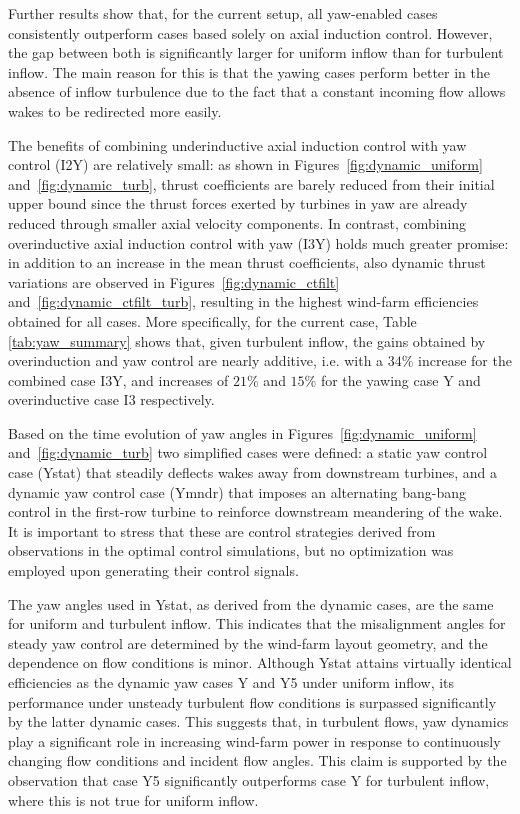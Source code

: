 \documentclass[energies,article,submit,moreauthors,latex,10pt,a4paper]{mdpi}
\newcommand{\revision}[1]{{\color{red} #1}}
\begin{document}
Further results show that, for the current setup, all yaw-enabled cases consistently outperform cases based solely on axial induction control. However, the gap between both is significantly larger for uniform inflow than for turbulent inflow. The main reason for this is that the yawing cases perform better in the absence of inflow turbulence due to the fact that a \revision{constant incoming} flow allows wakes to be redirected more easily. 

The benefits of combining underinductive axial induction control with yaw control (I2Y) are relatively small: as shown in Figures~\ref{fig:dynamic_uniform} and~\ref{fig:dynamic_turb}, thrust coefficients are barely reduced from their initial upper bound since the thrust forces exerted by turbines in yaw are already reduced through smaller axial velocity components. In contrast, combining overinductive axial induction control with yaw (I3Y) holds much greater promise: in addition to an increase in the mean thrust coefficients, also dynamic thrust variations are observed in Figures~\ref{fig:dynamic_ctfilt} and~\ref{fig:dynamic_ctfilt_turb}, resulting in the highest wind-farm efficiencies obtained for all cases. More specifically, for the current case, Table \ref{tab:yaw_summary} shows that, given turbulent inflow, the gains obtained by overinduction and yaw control are nearly additive, i.e. with a $34\%$ increase for the combined case I3Y, and increases of $21\%$ and $15\%$ for the yawing case Y and overinductive case I3 respectively.

Based on the time evolution of yaw angles in Figures~\ref{fig:dynamic_uniform} and~\ref{fig:dynamic_turb} two simplified cases were defined: a static yaw control case (Ystat) that steadily deflects wakes away from downstream turbines, and a dynamic yaw control case (Ymndr) that imposes an alternating bang-bang control in the first-row turbine to reinforce downstream meandering of the wake. It is important to stress that these are control strategies derived from observations in the optimal control simulations, but no optimization was employed upon generating their control signals. 

The yaw angles used in Ystat, as derived from the dynamic cases, are the same for uniform and turbulent inflow. This indicates that the misalignment angles for steady yaw control are determined by the wind-farm layout geometry, and the dependence on flow conditions is minor. Although Ystat attains virtually identical efficiencies as the dynamic yaw cases Y and Y5 under uniform inflow, its performance under unsteady turbulent flow conditions is surpassed significantly by the latter dynamic cases. This suggests that, in turbulent flows, yaw dynamics play a significant role in increasing wind-farm power in response to continuously changing flow conditions and incident flow angles. This claim is supported by the observation that case Y5 significantly outperforms case Y for turbulent inflow, where this is not true for uniform inflow. 
\end{document}
